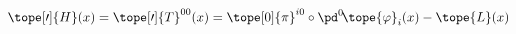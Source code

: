 \begin{equation}	\label{12.23}
\tope[\prime]{H}(x)
= \tope[\prime]{T}^{00}(x)
= \tope[0]{\pi}^{i0} \circ \pd^0\! \tope{\varphi}_i(x) - \tope{L}(x)
	\end{equation}


